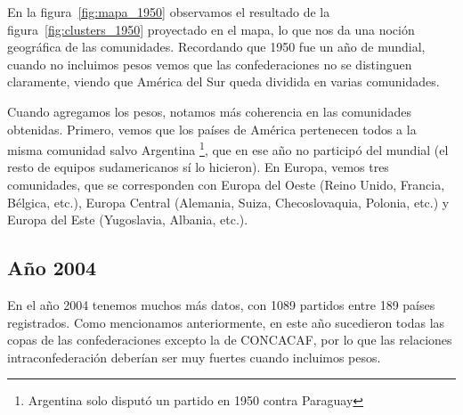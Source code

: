 \documentclass{article}
\begin{document}
En la figura~\ref{fig:mapa_1950} observamos el resultado de la figura~\ref{fig:clusters_1950} proyectado en el mapa, lo que nos da una noción geográfica de las comunidades. Recordando que 1950 fue un año de mundial,
cuando no incluimos pesos vemos que las confederaciones no se distinguen claramente, viendo que 
América del Sur queda dividida en varias comunidades.

Cuando agregamos los pesos, notamos más coherencia en las comunidades obtenidas. Primero, vemos que
los países de América pertenecen todos a la misma comunidad salvo Argentina
\footnote{Argentina solo disputó un partido en 1950 contra Paraguay}, que en ese año no participó
del mundial (el resto de equipos sudamericanos sí lo hicieron). En Europa, vemos tres comunidades, que se
corresponden con Europa del Oeste (Reino Unido, Francia, Bélgica, etc.), Europa Central (Alemania, Suiza,
Checoslovaquia, Polonia, etc.) y Europa del Este (Yugoslavia, Albania, etc.).

\subsection{Año 2004}

En el año 2004 tenemos muchos más datos, con 1089 partidos entre 189 países registrados. Como mencionamos
anteriormente, en este año sucedieron todas las copas de las confederaciones excepto la de CONCACAF, por lo 
que las relaciones intraconfederación deberían ser muy fuertes cuando incluimos pesos.
\end{document}
